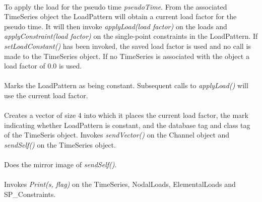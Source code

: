 \\
To apply the load for the pseudo time {\em pseudoTime}. From the
associated TimeSeries object the LoadPattern will obtain a current
load factor for the pseudo time. It will then invoke {\em
applyLoad(load factor)} on the loads and {\em applyConstraint(load
factor)} on the single-point constraints in the LoadPattern. If {\em
setLoadConstant()} has been invoked, the saved load factor is used and
no call is made to the TimeSeries object. If no TimeSeries is
associated with the object a load factor of $0.0$ is used. \\

\\ 
Marks the LoadPattern as being constant. Subsequent calls to {\em
applyLoad()} will use the current load factor. \\

\\
Creates a vector of size 4 into which it places the current load
factor, the mark indicating whether LoadPattern is constant, and the
database tag and class tag of the TimeSeris object. Invokes {\em
sendVector()} on the Channel object and {\em sendSelf()} on the
TimeSeries object. \\

\\
Does the mirror image of {\em sendSelf()}. \\

\\
Invokes {\em Print(s, flag)} on the TimeSeries, NodalLoads,
ElementalLoads and SP\_Constraints. 
